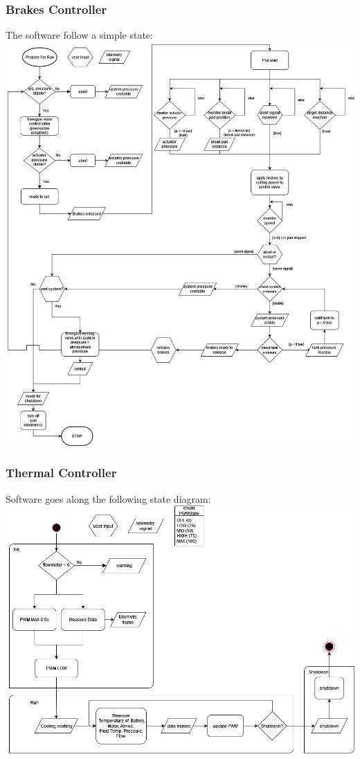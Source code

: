 \subsubsection{Brakes Controller}
The software follow a simple state: \\

\includegraphics[width=\textwidth]{texfiles/elec/eimg/brakesoftware_ext}

\subsubsection{Thermal Controller}
Software goes along the following state diagram: \\
\includegraphics[width=\textwidth]{texfiles/elec/eimg/thermalsystemsflowchartsoftware}

